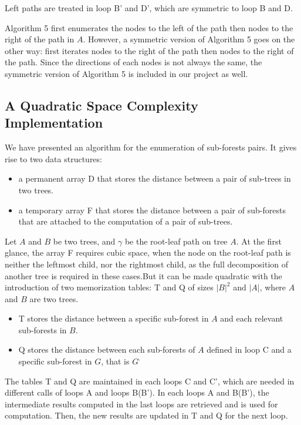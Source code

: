 Left paths are treated in loop B' and D', which are symmetric to loop B and D.

Algorithm 5 first enumerates the nodes to the left of the path then nodes to the right of the path in $A$. However, a symmetric version of Algorithm 5 goes on the other way: first iterates nodes to the right of the path then nodes to the right of the path. Since the directions of each nodes is not always the same, the symmetric version of  Algorithm 5 is included in our project as well.


\subsection{A Quadratic Space Complexity Implementation}
We have presented an algorithm for the enumeration of sub-forests pairs. It gives rise to two data structures:
\begin{itemize}
\item a permanent array D that stores the distance between a pair of sub-trees in two trees.
\item a temporary array F that stores the distance between a pair of sub-forests that are attached to the computation of a pair of sub-trees. 
\end{itemize}

Let $A$ and $B$ be two trees, and $\gamma$ be the root-leaf path on tree $A$. At the first glance, the array F requires cubic space, when the node on the root-leaf path is neither the leftmost child, nor the rightmost child, as the full decomposition of another tree is required in these cases.But it can be made quadratic with the introduction of two memorization tables: T and Q of sizes $\left\vert B \right\vert^2$ and $\left\vert A \right\vert$, where $A$ and $B$ are two trees.
\begin{itemize}
\item T stores the distance between a specific sub-forest in $A$ and each relevant sub-forests in $B$. 
\item Q stores the distance between each sub-forests of $A$ defined in loop C and a specific sub-forest in $G$, that is $G^{\comp}$
\end{itemize}

The tables T and Q are maintained in each loops C and C', which are needed in different calls of loops A and loops B(B').  In each loops A and B(B'), the intermediate results computed in the last loops are retrieved and is used for computation. Then, the new results are updated in T and Q for the next loop.

